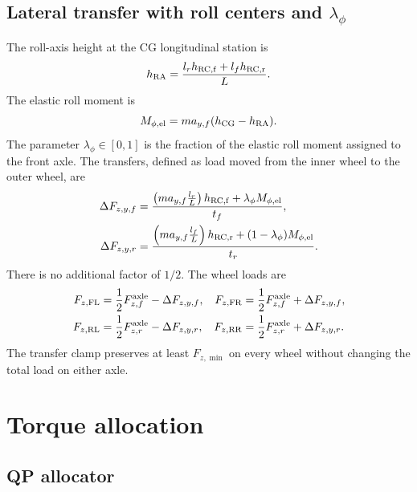\documentclass[11pt,a4paper]{article}
\newcommand{\FL}{\mathrm{FL}}
\newcommand{\FR}{\mathrm{FR}}
\newcommand{\RL}{\mathrm{RL}}
\newcommand{\RR}{\mathrm{RR}}
\begin{document}
\subsection{Lateral transfer with roll centers and
\texorpdfstring{$\lambda_\phi$}{lambda}}

The roll-axis height at the CG longitudinal station is
\begin{equation}
h_{\rm RA}=\frac{l_rh_{\rm RC,f}+l_fh_{\rm RC,r}}{L}.
\end{equation}
The elastic roll moment is
\begin{equation}
M_{\phi,\rm el}=ma_{y,f}(h_{\rm CG}-h_{\rm RA}).
\end{equation}
The parameter $\lambda_\phi\in[0,1]$ is the fraction of the elastic roll
moment assigned to the front axle. The transfers, defined as load moved from
the inner wheel to the outer wheel, are
\begin{align}
\Delta F_{z,y,f}&=
\frac{
\left(ma_{y,f}\frac{l_r}{L}\right)h_{\rm RC,f}
+\lambda_\phi M_{\phi,\rm el}}{t_f},\\
\Delta F_{z,y,r}&=
\frac{
\left(ma_{y,f}\frac{l_f}{L}\right)h_{\rm RC,r}
+(1-\lambda_\phi)M_{\phi,\rm el}}{t_r}.
\end{align}
There is no additional factor of $1/2$. The wheel loads are
\begin{align}
F_{z,\FL}&=\frac12F_{z,f}^{\rm axle}-\Delta F_{z,y,f},&
F_{z,\FR}&=\frac12F_{z,f}^{\rm axle}+\Delta F_{z,y,f},\\
F_{z,\RL}&=\frac12F_{z,r}^{\rm axle}-\Delta F_{z,y,r},&
F_{z,\RR}&=\frac12F_{z,r}^{\rm axle}+\Delta F_{z,y,r}.
\end{align}
The transfer clamp preserves at least $F_{z,\min}$ on every wheel without
changing the total load on either axle.

\section{Torque allocation}

\subsection{QP allocator}
\end{document}
